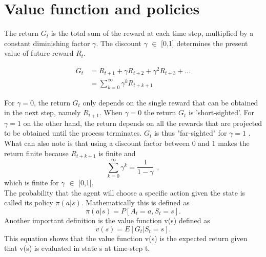 \section{Value function and policies}
The return $G_t$ is the total sum of the reward at each time step, multiplied by a constant diminishing factor $\gamma$.
The discount $\gamma$ $\in$ [0,1] determines the present value of future reward $R_{t}$.

\begin{align}
	G_t &= R_{t+1}+\gamma R_{t+2} +\gamma^2 R_{t+3}+ ... \nonumber\\
	&= \sum_{k=0}^{\infty}\gamma^{k} R_{t+k+1}
	\label{eq:G_t}
\end{align}

For $\gamma=0$, the return $G_t$ only depends on the single reward that can be obtained in the next step, namely $R_{t+1}$. When $\gamma=0$ the return $G_t$ is 'short-sighted'. For $\gamma=1$ on the other hand, the return depends on all the rewards that are projected to be obtained until the process terminates. $G_t$ is thus "far-sighted" for $\gamma=1$ \cite{sutton_barto}.
What can also note is that using a discount factor between 0 and 1 makes the return finite because $R_{t+k+1}$ is finite and
\begin{equation}
	\sum_{k=0}^{\infty}\gamma^{k}=\frac{1}{1-\gamma}\hspace{5pt},
\end{equation}
which is finite for $\gamma$ $\in$ [0,1]. \\
The probability that the agent will choose a specific action given the state is called its policy $\pi(a|s)$. Mathematically this is defined as
\begin{equation}
	\pi(a|s) = P[A_t = a, S_t = s].
\end{equation}
Another important definition is the value function v(s) defined as
\begin{equation}
	v(s) = E[G_t | S_t = s].
\end{equation}
This equation shows that the value function v(s) is the expected return given that v(s) is evaluated in state s at time-step t.
